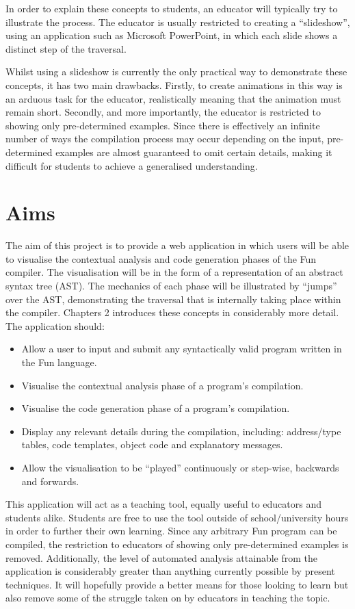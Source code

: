 \documentclass{l4proj}
\begin{document}
In order to explain these concepts to students, an educator will typically try to illustrate the process. The educator is usually restricted to creating a ``slideshow'', using an application such as Microsoft PowerPoint, in which each slide shows a distinct step of the traversal. 

Whilst using a slideshow is currently the only practical way to demonstrate these concepts, it has two main drawbacks. Firstly, to create animations in this way is an arduous task for the educator, realistically meaning that the animation must remain short. Secondly, and more importantly, the educator is restricted to showing only pre-determined examples. Since there is effectively an infinite number of ways the compilation process may occur depending on the input, pre-determined examples are almost guaranteed to omit certain details, making it difficult for students to achieve a generalised understanding.

\section{Aims}
The aim of this project is to provide a web application in which users will be able to visualise the contextual analysis and code generation phases of the Fun compiler. The visualisation will be in the form of a representation of an abstract syntax tree (AST). The mechanics of each phase will be illustrated by ``jumps'' over the AST, demonstrating the traversal that is internally taking place within the compiler. Chapters 2 introduces these concepts in considerably more detail. The application should:
\begin{itemize}
\item Allow a user to input and submit any syntactically valid program written in the Fun language.
\item Visualise the contextual analysis phase of a program's compilation. 
\item Visualise the code generation phase of a program's compilation.
\item Display any relevant details during the compilation, including: address/type tables, code templates, object code and explanatory messages.
\item Allow the visualisation to be ``played'' continuously or step-wise, backwards and forwards.
\end{itemize}

This application will act as a teaching tool, equally useful to educators and students alike. Students are free to use the tool outside of school/university hours in order to further their own learning. Since any arbitrary Fun program can be compiled, the restriction to educators of showing only pre-determined examples is removed. Additionally, the level of automated analysis attainable from the application is considerably greater than anything currently possible by present techniques. It will hopefully provide a better means for those looking to learn but also remove some of the struggle taken on by educators in teaching the topic.
\end{document}
